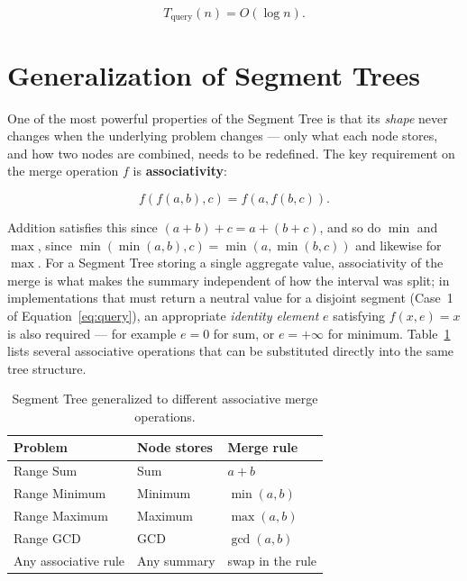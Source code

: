\documentclass[11pt]{article}
\begin{document}
\begin{equation}
\boxed{T_{\text{query}}(n) = O(\log n)}.
\end{equation}

\section{Generalization of Segment Trees}
\label{sec:generalization}

One of the most powerful properties of the Segment Tree is that its \emph{shape} never changes when the underlying problem changes --- only what each node stores, and how two nodes are combined, needs to be redefined. The key requirement on the merge operation $f$ is \textbf{associativity}:

\begin{equation}
f(f(a,b),c) = f(a,f(b,c)).
\end{equation}

Addition satisfies this since $(a+b)+c = a+(b+c)$, and so do $\min$ and $\max$, since $\min(\min(a,b),c) = \min(a,\min(b,c))$ and likewise for $\max$. For a Segment Tree storing a single aggregate value, associativity of the merge is what makes the summary independent of how the interval was split; in implementations that must return a neutral value for a disjoint segment (Case~1 of Equation~\eqref{eq:query}), an appropriate \emph{identity element} $e$ satisfying $f(x,e) = x$ is also required --- for example $e = 0$ for sum, or $e = +\infty$ for minimum. Table~\ref{tab:generalization} lists several associative operations that can be substituted directly into the same tree structure.

\begin{table}[h]
\centering
\caption{Segment Tree generalized to different associative merge operations.}
\label{tab:generalization}
\begin{tabular}{lll}
\toprule
\textbf{Problem} & \textbf{Node stores} & \textbf{Merge rule} \\
\midrule
Range Sum     & Sum         & $a+b$ \\
Range Minimum & Minimum     & $\min(a,b)$ \\
Range Maximum & Maximum     & $\max(a,b)$ \\
Range GCD     & GCD         & $\gcd(a,b)$ \\
\rowcolor{lightblue!30}
Any associative rule & Any summary & swap in the rule \\
\bottomrule
\end{tabular}
\end{table}
\end{document}
